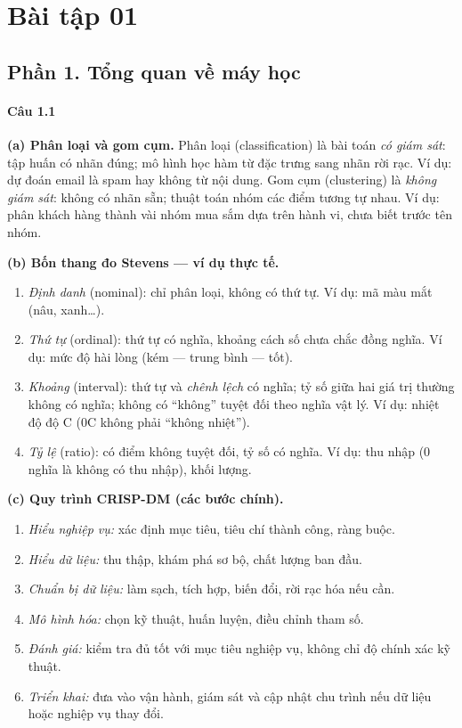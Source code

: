 \section*{Bài tập 01}

\subsection*{Phần 1. Tổng quan về máy học}

\paragraph{Câu 1.1}

\textbf{(a) Phân loại và gom cụm.} Phân loại (classification) là bài toán \emph{có giám sát}: tập huấn có nhãn đúng; mô hình học hàm từ đặc trưng sang nhãn rời rạc. Ví dụ: dự đoán email là spam hay không từ nội dung. Gom cụm (clustering) là \emph{không giám sát}: không có nhãn sẵn; thuật toán nhóm các điểm tương tự nhau. Ví dụ: phân khách hàng thành vài nhóm mua sắm dựa trên hành vi, chưa biết trước tên nhóm.

\textbf{(b) Bốn thang đo Stevens — ví dụ thực tế.}
\begin{enumerate}
  \item \emph{Định danh} (nominal): chỉ phân loại, không có thứ tự. Ví dụ: mã màu mắt (nâu, xanh\dots).
  \item \emph{Thứ tự} (ordinal): thứ tự có nghĩa, khoảng cách số chưa chắc đồng nghĩa. Ví dụ: mức độ hài lòng (kém --- trung bình --- tốt).
  \item \emph{Khoảng} (interval): thứ tự và \emph{chênh lệch} có nghĩa; tỷ số giữa hai giá trị thường không có nghĩa; không có ``không'' tuyệt đối theo nghĩa vật lý. Ví dụ: nhiệt độ độ C (0\textdegree{}C không phải ``không nhiệt'').
  \item \emph{Tỷ lệ} (ratio): có điểm không tuyệt đối, tỷ số có nghĩa. Ví dụ: thu nhập (0 nghĩa là không có thu nhập), khối lượng.
\end{enumerate}

\textbf{(c) Quy trình CRISP-DM (các bước chính).}
\begin{enumerate}
  \item \emph{Hiểu nghiệp vụ:} xác định mục tiêu, tiêu chí thành công, ràng buộc.
  \item \emph{Hiểu dữ liệu:} thu thập, khám phá sơ bộ, chất lượng ban đầu.
  \item \emph{Chuẩn bị dữ liệu:} làm sạch, tích hợp, biến đổi, rời rạc hóa nếu cần.
  \item \emph{Mô hình hóa:} chọn kỹ thuật, huấn luyện, điều chỉnh tham số.
  \item \emph{Đánh giá:} kiểm tra đủ tốt với mục tiêu nghiệp vụ, không chỉ độ chính xác kỹ thuật.
  \item \emph{Triển khai:} đưa vào vận hành, giám sát và cập nhật chu trình nếu dữ liệu hoặc nghiệp vụ thay đổi.
\end{enumerate}

